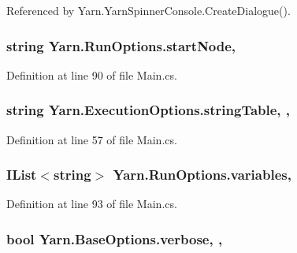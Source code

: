 Referenced by Yarn.\-Yarn\-Spinner\-Console.\-Create\-Dialogue().

\hypertarget{a00157_a785bd0f1c8b6674e7a1cfbe38c29b961}{
\subsubsection[{start\-Node}]{\setlength{\rightskip}{0pt plus 5cm}string Yarn.\-Run\-Options.\-start\-Node\hspace{0.3cm}{\ttfamily [get]}, {\ttfamily [set]}}}\label{a00157_a785bd0f1c8b6674e7a1cfbe38c29b961}


Definition at line 90 of file Main.\-cs.

\hypertarget{a00103_a7e43c3b73722956cb0f5d507e4eef527}{
\subsubsection[{string\-Table}]{\setlength{\rightskip}{0pt plus 5cm}string Yarn.\-Execution\-Options.\-string\-Table\hspace{0.3cm}{\ttfamily [get]}, {\ttfamily [set]}, {\ttfamily [inherited]}}}\label{a00103_a7e43c3b73722956cb0f5d507e4eef527}


Definition at line 57 of file Main.\-cs.

\hypertarget{a00157_a2222c73ce5366b02490c6123b711f596}{
\subsubsection[{variables}]{\setlength{\rightskip}{0pt plus 5cm}I\-List$<$string$>$ Yarn.\-Run\-Options.\-variables\hspace{0.3cm}{\ttfamily [get]}, {\ttfamily [set]}}}\label{a00157_a2222c73ce5366b02490c6123b711f596}


Definition at line 93 of file Main.\-cs.

\hypertarget{a00041_ada4d83d1756918f362d55f6649b82b17}{
\subsubsection[{verbose}]{\setlength{\rightskip}{0pt plus 5cm}bool Yarn.\-Base\-Options.\-verbose\hspace{0.3cm}{\ttfamily [get]}, {\ttfamily [set]}, {\ttfamily [inherited]}}}\label{a00041_ada4d83d1756918f362d55f6649b82b17}


